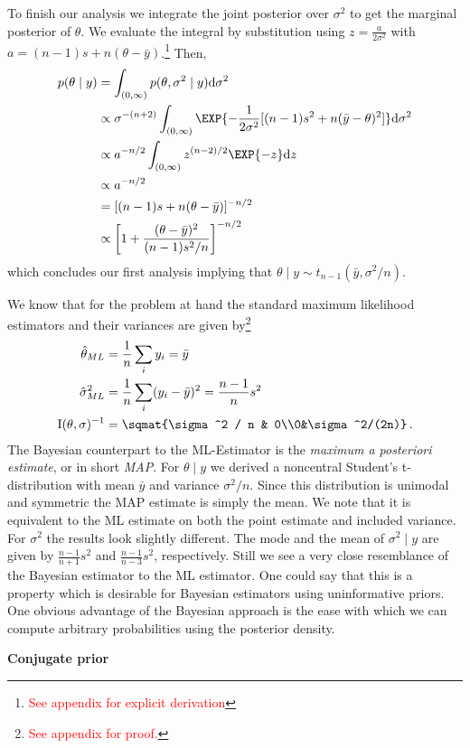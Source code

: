 To finish our analysis we integrate the joint posterior over $\sigma^2$ to get
the marginal posterior of $\theta$. We evaluate the integral by substitution using
$z = \frac{a}{2 \sigma^2}$ with $a = (n-1)s + n(\theta - \bar{y})$.\footnote{\textcolor{red}{See appendix for explicit derivation}}
Then,
\begin{align}
  p(\theta \mid y) &= \int_{(0, \infty)} p(\theta, \sigma^2 \mid y) \mathrm{d}\sigma^2\\
  &\propto \sigma^{-(n+2)} \int_{(0, \infty)} \EXP{-\frac{1}{2\sigma^2}[(n-1) s^2 + n(\bar{y} - \theta)^2]} \mathrm{d} \sigma^2\\
  &\propto a^{-n/2} \int_{(0, \infty)} z^{(n-2)/2}\EXP{-z} \mathrm{d}z\\
  &\propto a^{-n/2}\\
  &= [(n-1)s + n(\theta - \bar{y})]^{-n/2}\\
  &\propto \left[1 + \frac{(\theta - \bar{y})^2}{(n-1) s^2 / n}\right]^{-n/2} \,
\end{align}
which concludes our first analysis implying that $\theta \mid y \sim t_{n-1}(\bar{y}, \sigma^2/n)$.




We know that for the problem at hand the standard maximum likelihood estimators
and their variances are given by\footnote{\textcolor{red}{See appendix for proof.}}
\begin{align}
  \hat{\theta}_{ML} &= \frac{1}{n} \sum_i y_i = \bar{y}\,\\
  \hat{\sigma}_{ML}^2 &= \frac{1}{n} \sum_i (y_i - \bar{y})^2 = \frac{n-1}{n} s^2\,\\
  \mathrm{I}(\theta, \sigma)^{-1} &= \sqmat{\sigma^2 / n & 0\\0&\sigma^2/(2n)} \,.
\end{align}
The Bayesian counterpart to the ML-Estimator is the \emph{maximum a posteriori estimate},
or in short \emph{MAP}. For $\theta \mid y$ we derived a noncentral Student's t-distribution
with mean $\bar{y}$ and variance $\sigma^2/n$. Since this distribution is unimodal and
symmetric the MAP estimate is simply the mean. We note that it is equivalent to
the ML estimate on both the point estimate and included variance. For $\sigma^2$
the results look slightly different. The mode and the mean of $\sigma^2 \mid y$
are given by $\frac{n-1}{n+1} s^2$ and $\frac{n-1}{n-3} s^2$, respectively.
Still we see a very close resemblance of the Bayesian estimator to the ML estimator.
One could say that this is a property which is desirable for Bayesian estimators
using uninformative priors. One obvious advantage of the Bayesian approach is the
ease with which we can compute arbitrary probabilities using the posterior density.


\textbf{Conjugate prior}
